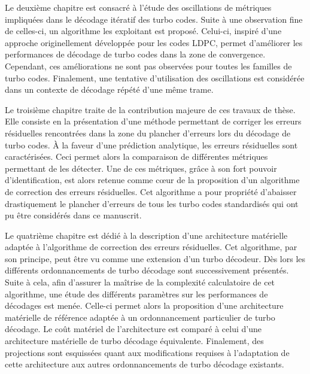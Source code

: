 Le deuxième chapitre est consacré à l'étude des oscillations de métriques impliquées dans le décodage itératif des 
turbo codes. Suite à une observation fine de celles-ci, un algorithme les exploitant est proposé. Celui-ci, inspiré 
d'une approche originellement développée pour les codes LDPC, permet d'améliorer les performances de décodage de turbo codes dans la 
zone de convergence. Cependant, ces améliorations ne sont pas observées pour toutes les familles de turbo codes. 
Finalement, une tentative d'utilisation des oscillations est considérée dans un contexte de décodage répété d'une même 
trame.

Le troisième chapitre traite de la contribution majeure de ces travaux de thèse. Elle consiste en la présentation d'une méthode 
permettant de corriger les erreurs résiduelles rencontrées dans la zone du plancher d'erreurs lors du décodage de turbo 
codes. À la faveur d'une prédiction analytique, les erreurs résiduelles sont caractérisées. Ceci permet alors la 
comparaison de différentes métriques permettant de les détecter. Une de ces métriques, grâce à son fort pouvoir 
d'identification, est alors retenue comme cœur de la proposition d'un algorithme de correction des erreurs résiduelles. 
Cet algorithme a pour propriété d'abaisser drastiquement le plancher d'erreurs de tous les turbo codes standardisés
qui ont pu être considérés dans ce manuscrit. 

Le quatrième chapitre est dédié à la description d'une architecture matérielle adaptée à l'algorithme de correction 
des erreurs résiduelles. Cet algorithme, par son principe, peut être vu comme une extension d'un turbo décodeur. Dès 
lors les différents ordonnancements de turbo décodage sont successivement présentés. Suite à cela, afin d'assurer la maîtrise de la complexité 
calculatoire de cet algorithme, une étude des différents paramètres 
sur les performances de décodages est menée. Celle-ci permet alors la proposition d'une architecture 
matérielle de référence adaptée à un ordonnancement particulier de turbo décodage. Le coût matériel de l'architecture 
est comparé à celui d'une architecture matérielle de turbo décodage équivalente. Finalement, des projections sont 
esquissées quant aux modifications requises à l'adaptation de cette architecture aux autres ordonnancements de turbo 
décodage existants.

